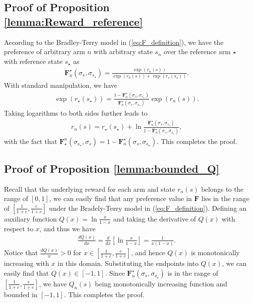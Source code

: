 \documentclass{article} %
\def\eqref#1{equation~\ref{#1}}
\newcommand{\I}{\sigma}
\newcommand{\bF}{\mathbf{F}}
\renewcommand{\eqref}[1]{(\ref{#1})}
\begin{document}
{\subsection{Proof of Proposition \ref{lemma:Reward_reference}}

According to the Bradley-Terry model in (\ref{eq:F_definition}), we have the preference of arbitrary arm $n$ with arbitrary state $s_n$ over the reference arm $\star$ with reference state $s_\star$ as
\begin{align}
    \bF_n^\star(\sigma_s, \sigma_{s_\star})=\frac{\exp(r_n(s))}{\exp(r_n(s))+\exp(r_\star(s_\star))}.
\end{align}
With standard manipulation, we have
\begin{align}
    \exp(r_\star(s_\star))=\frac{1-\bF_n^\star(\sigma_s, \sigma_{s_\star})}{\bF_n^\star(\sigma_s, \sigma_{s_\star})}\exp(r_n(s)). 
\end{align}
Taking logarithms to both sides further leads to 
\begin{align}
    r_n(s)=r_\star(s_\star)+\ln\frac{\bF_n^\star(\sigma_s, \sigma_{s_\star})}{1-\bF_n^\star(\sigma_s, \sigma_{s_\star})},
\end{align}
with the fact that $\bF_\star^n(\sigma_{s_\star},\sigma_s)=1-\bF_n^\star(\sigma_{s},\sigma_{s_\star})$. This completes the proof.



\subsection{Proof of Proposition \ref{lemma:bounded_Q}}

Recall that the underlying reward for each arm and state $r_n(s)$ belongs to the range of $ [0, 1]$, we can easily find that any preference value in $\bF$ lies in the range of $[\frac{1}{1+e}, \frac{e}{1+e}]$ under the Bradely-Terry model in \eqref{eq:F_definition}. Defining an auxiliary function $Q(x)=\ln \frac{x}{1-x}$ and taking the derivative of $Q(x)$ with respect to $x$, and thus we have
\begin{align}
    \frac{dQ(x)}{dx}=\frac{d}{dx}\left[\ln\frac{x}{1-x}\right]=\frac{1}{x(1-x)}.
\end{align}
Notice that $\frac{dQ(x)}{x}>0$ for $x\in[\frac{1}{1+e}, \frac{e}{1+e}]$, and hence $Q(x)$ is monotonically increasing with $x$ in this domain. Substituting the endpoints into $Q(x)$, we can easily find that
$Q(x)\in[-1, 1]$. Since $\bF_n^\star(\I_s, \I_{s_\star})$ is in the range of $[\frac{1}{1+e}, \frac{e}{1+e}]$, we have $Q_n(s)$ being monotonically increasing function and bounded in $[-1, 1]$. This completes the proof.




}
\end{document}
